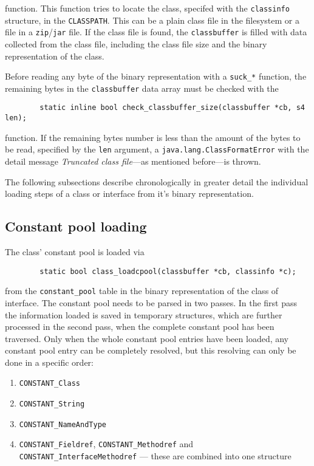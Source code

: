 function. This function tries to locate the class, specifed with the
\texttt{classinfo} structure, in the \texttt{CLASSPATH}. This can be
a plain class file in the filesystem or a file in a
\texttt{zip}/\texttt{jar} file. If the class file is found, the
\texttt{classbuffer} is filled with data collected from the class
file, including the class file size and the binary representation of
the class.

Before reading any byte of the binary representation with a
\texttt{suck\_*} function, the remaining bytes in the
\texttt{classbuffer} data array must be checked with the

\begin{verbatim}
        static inline bool check_classbuffer_size(classbuffer *cb, s4 len);
\end{verbatim}

function. If the remaining bytes number is less than the amount of the
bytes to be read, specified by the \texttt{len} argument, a
\texttt{java.lang.ClassFormatError} with the detail message
\textit{Truncated class file}---as mentioned before---is thrown.

The following subsections describe chronologically in greater detail
the individual loading steps of a class or interface from it's binary
representation.


\subsection{Constant pool loading}

The class' constant pool is loaded via

\begin{verbatim}
        static bool class_loadcpool(classbuffer *cb, classinfo *c);
\end{verbatim}

from the \texttt{constant\_pool} table in the binary representation of
the class of interface. The constant pool needs to be parsed in two
passes. In the first pass the information loaded is saved in temporary
structures, which are further processed in the second pass, when the
complete constant pool has been traversed. Only when the whole
constant pool entries have been loaded, any constant pool entry can be
completely resolved, but this resolving can only be done in a specific
order:

\begin{enumerate}
 \item \texttt{CONSTANT\_Class}

 \item \texttt{CONSTANT\_String}

 \item \texttt{CONSTANT\_NameAndType}

 \item \texttt{CONSTANT\_Fieldref}, \texttt{CONSTANT\_Methodref} and
 \texttt{CONSTANT\_InterfaceMethodref} --- these are combined into one
 structure
\end{enumerate}

